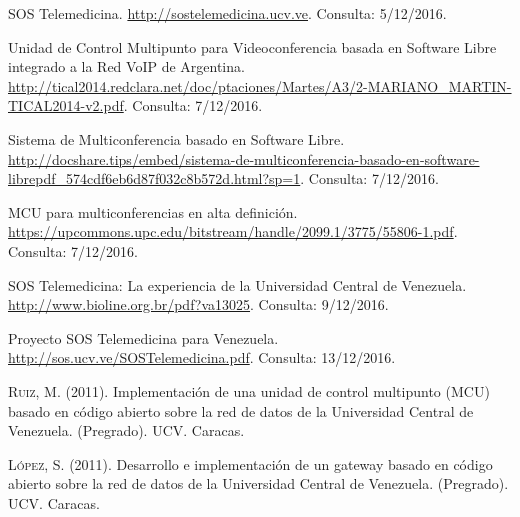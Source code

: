 \documentclass[12pt,letterpaper]{article}
\begin{document}
\begin{thebibliography}{10}
 SOS Telemedicina. \textcolor{blue}{\small{\url{http://sostelemedicina.ucv.ve}}}. Consulta: 5/12/2016.

 Unidad de Control Multipunto para Videoconferencia basada en Software Libre integrado a la Red VoIP de Argentina. \textcolor{blue}{\small{\url{http://tical2014.redclara.net/doc/ptaciones/Martes/A3/2-MARIANO_MARTIN-TICAL2014-v2.pdf}}}. Consulta: 7/12/2016.

 Sistema de Multiconferencia basado en Software Libre. \textcolor{blue}{\small {\url{http://docshare.tips/embed/sistema-de-multiconferencia-basado-en-software-librepdf_574cdf6eb6d87f032c8b572d.html?sp=1}}}. Consulta: 7/12/2016.

 MCU para multiconferencias en alta definición. \textcolor{blue}{\small{\url{https://upcommons.upc.edu/bitstream/handle/2099.1/3775/55806-1.pdf}}}. Consulta: 7/12/2016.

 SOS Telemedicina: La experiencia de la Universidad Central de Venezuela. \textcolor{blue}{\small {\url{http://www.bioline.org.br/pdf?va13025}}}. Consulta: 9/12/2016.

 Proyecto SOS Telemedicina para Venezuela. \textcolor{blue}{\small {\url{http://sos.ucv.ve/SOSTelemedicina.pdf}}}. Consulta: 13/12/2016.

\textsc{Ruiz, M.} (2011). Implementación de una unidad de control multipunto (MCU) basado en código abierto sobre la red de datos de la Universidad Central de Venezuela. (Pregrado). UCV. Caracas. 

\textsc{López, S.} (2011). Desarrollo e implementación de un gateway basado en código abierto sobre la red de datos de la Universidad Central de Venezuela. (Pregrado). UCV. Caracas.
\end{thebibliography}



\end{document}
